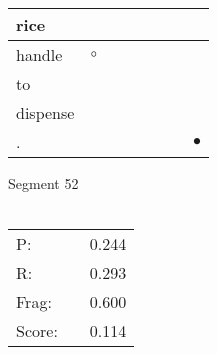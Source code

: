\documentclass[landscape]{article}
\newcommand{\ssp}{\hspace{2pt}}
\newcommand{\mex}{\cellcolor{g}$\bullet$}
\newcommand{\map}{\cellcolor{y}$\boldsymbol\circ$}
\begin{document}
\begin{tabular}{|l|p{10pt}|p{10pt}|p{10pt}|p{10pt}|p{10pt}|p{10pt}|p{10pt}|}
\hline
\ssp rice \ssp&\hspace{2pt}&\hspace{2pt}&\hspace{2pt}&\hspace{2pt}&\hspace{2pt}&\hspace{2pt}&\hspace{2pt}\\
\hline
\ssp \cellcolor{ref0}handle \ssp&\hspace{2pt}\map&\hspace{2pt}&\hspace{2pt}&\hspace{2pt}&\hspace{2pt}&\hspace{2pt}&\hspace{2pt}\\
\hline
\ssp to \ssp&\hspace{2pt}&\hspace{2pt}&\hspace{2pt}&\hspace{2pt}&\hspace{2pt}&\hspace{2pt}&\hspace{2pt}\\
\hline
\ssp dispense \ssp&\hspace{2pt}&\hspace{2pt}&\hspace{2pt}&\hspace{2pt}&\hspace{2pt}&\hspace{2pt}&\hspace{2pt}\\
\hline
\ssp \cellcolor{ref6}. \ssp&\hspace{2pt}&\hspace{2pt}&\hspace{2pt}&\hspace{2pt}&\hspace{2pt}&\hspace{2pt}&\hspace{2pt}\mex\\
\hline
\end{tabular}

\vspace{6pt}
\noindent Segment 52\\\\
\noindent\begin{tabular}{lm{12pt}r}
\hline
P:&&0.244\\
R:&&0.293\\
Frag:&&0.600\\
Score:&&0.114\\
\end{tabular}
\end{document}
